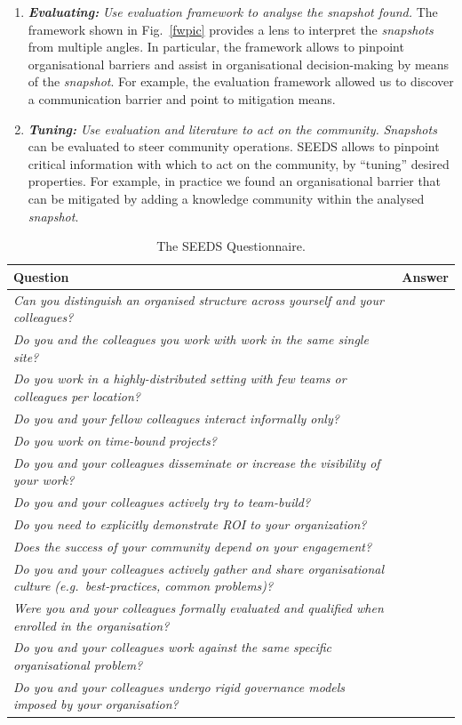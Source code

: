 \begin{enumerate}
\item \emph{\bf Evaluating:} \emph{Use evaluation framework to analyse the \emph{snapshot} found.}
The framework shown in Fig.~\ref{fwpic} provides a lens to interpret the \emph{\emph{snapshots}} from multiple angles. In particular, the framework allows to pinpoint organisational barriers and assist in organisational decision-making by means of the \emph{snapshot}. For example, the evaluation framework allowed us to discover a communication barrier and point to mitigation means.

\item \emph{\bf Tuning:} \emph{Use evaluation and literature \cite{ossslr} to act on the community.}
\emph{\emph{Snapshots}} can be evaluated to steer community operations. SEEDS allows to pinpoint critical information with which to act on the community, by ``tuning'' desired properties. For example, in practice we found an organisational barrier that can be mitigated by adding a knowledge community within the analysed \emph{snapshot}.

\end{enumerate}
\begin{table}
\hspace{1cm}

\begin{tabular}{|>{\raggedright}p{11cm}|>{\raggedright}p{1.5cm}|}
\hline 
\textbf{Question} & \textbf{Answer}\tabularnewline
\hline 
\emph{Can you distinguish an organised structure across yourself and
your colleagues?} & \tabularnewline
\hline 
\emph{Do you and the colleagues you work with work in the same single
site?} & \tabularnewline
\hline 
\emph{Do you work in a highly-distributed setting with few teams or
colleagues per location?} & \tabularnewline
\hline 
\emph{Do you and your fellow colleagues interact informally only?} & \tabularnewline
\hline 
\emph{Do you work on time-bound projects?} & \tabularnewline
\hline 
\emph{Do you and your colleagues disseminate or increase the visibility
of your work? } & \tabularnewline
\hline 
\emph{Do you and your colleagues actively try to team-build? } & \tabularnewline
\hline 
\emph{Do you need to explicitly demonstrate ROI to your organization? } & \tabularnewline
\hline 
\emph{Does the success of your community depend on your engagement? } & \tabularnewline
\hline 
\emph{Do you and your colleagues actively gather and share organisational
culture (e.g.~best-practices, common problems)?} & \tabularnewline
\hline 
\emph{Were you and your colleagues formally evaluated and qualified
when enrolled in the organisation? } & \tabularnewline
\hline 
\emph{Do you and your colleagues work against the same specific organisational
problem? } & \tabularnewline
\hline 
\emph{Do you and your colleagues undergo rigid governance models imposed
by your organisation? } & \tabularnewline
\hline 
\end{tabular}
\caption{The SEEDS Questionnaire.}\label{question}
\end{table}

